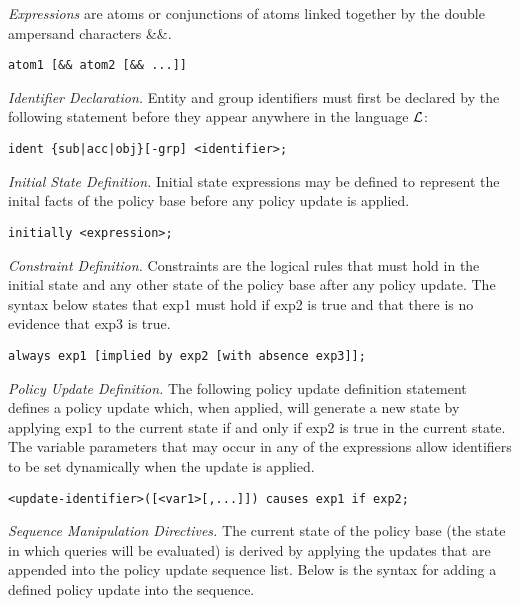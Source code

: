 \documentclass{llncs}
\begin{document}
    \noindent
    \emph{Expressions} are atoms or conjunctions of atoms linked together by
    the double ampersand characters \&\&.

    \begin{verbatim}atom1 [&& atom2 [&& ...]]\end{verbatim}

    \noindent
    \emph{Identifier Declaration.} Entity and group identifiers must first be
    declared by the following statement before they appear anywhere in the
    language $\cal{L}$:

    \begin{verbatim}ident {sub|acc|obj}[-grp] <identifier>;\end{verbatim}

    \noindent
    \emph{Initial State Definition.} Initial state expressions may be defined
    to represent the inital facts of the policy base before any policy update
    is applied.

    \begin{verbatim}initially <expression>;\end{verbatim}

    \noindent
    \emph{Constraint Definition.} Constraints are the logical rules that must
    hold in the initial state and any other state of the policy base after
    any policy update. The syntax below states that exp1 must hold if exp2 is 
    true and that there is no evidence that exp3 is true.

    \begin{verbatim}always exp1 [implied by exp2 [with absence exp3]];\end{verbatim}

    \noindent
    \emph{Policy Update Definition.} The following policy update definition
    statement defines a policy update which, when applied, will generate a new
    state by applying exp1 to the current state if and only if exp2 is true in
    the current state. The variable parameters that may occur in any of the
    expressions allow identifiers to be set dynamically when the update is
    applied.

    \begin{verbatim}<update-identifier>([<var1>[,...]]) causes exp1 if exp2;\end{verbatim}

    \noindent
    \emph{Sequence Manipulation Directives.} The current state of the policy
    base (the state in which queries will be evaluated) is derived by applying
    the updates that are appended into the policy update sequence list. Below
    is the syntax for adding a defined policy update into the sequence.
\end{document}
